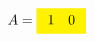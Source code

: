 \documentclass{article}
\begin{document}
\begin{gather*}
A=\colorbox{yellow}{$\begin{array}{cc}1 &0\end{array}$}
\end{gather*}
\end{document}
